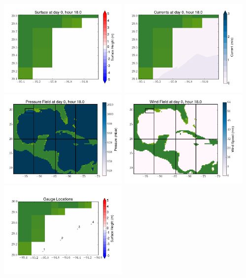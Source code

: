 \documentclass[11pt]{article}
\begin{document}
\includegraphics[width=0.475\textwidth]{frame0015fig6.png}
\vskip 10pt 
\includegraphics[width=0.475\textwidth]{frame0015fig7.png}
\includegraphics[width=0.475\textwidth]{frame0015fig8.png}
\vskip 10pt 
\includegraphics[width=0.475\textwidth]{frame0015fig9.png}
\includegraphics[width=0.475\textwidth]{frame0015fig10.png}
\end{document}
